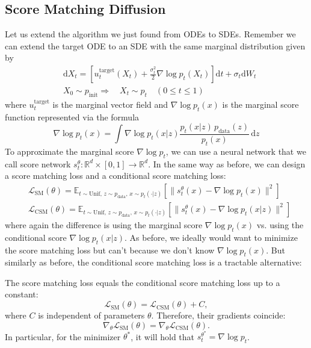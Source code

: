 \subsection{Score Matching Diffusion}
Let us extend the algorithm we just found from ODEs to SDEs. Remember we can extend the target ODE to an SDE with the same marginal distribution given by
\begin{equation}
    \begin{aligned}
    &\mathrm{d}X_t = \left[ u_t^{\text{target}}(X_t) + \frac{\sigma_t^2}{2} \nabla \log p_t(X_t) \right] \mathrm{d}t + \sigma_t \mathrm{d}W_t\\
    &X_0 \sim p_{\text{init}} \Rightarrow \quad X_t \sim p_t \quad (0 \leq t \leq 1)
    \end{aligned}
\end{equation}
where $u_t^{\text{target}}$ is the marginal vector field and $\nabla \log p_t(x)$ is the marginal score function represented via the formula
\begin{equation}
\nabla \log p_t(x) = \int \nabla \log p_t(x | z) \frac{p_t(x | z)\, p_{\text{data}}(z)}{p_t(x)} \, \mathrm{d}z
\end{equation}
To approximate the marginal score $\nabla \log p_t$, we can use a neural network that we call score network $s_t^\theta : \mathbb{R}^d \times [0, 1] \rightarrow \mathbb{R}^d$. In the same way as before, we can design a score matching loss and a conditional score matching loss:
\begin{equation}
    \begin{aligned}
    &\mathcal{L}_{\text{SM}}(\theta) = \mathbb{E}_{t \sim \text{Unif},\, z \sim p_{\text{data}},\, x \sim p_t(\cdot | z)} \left[ \| s_t^\theta(x) - \nabla \log p_t(x) \|^2 \right]\\
    &\mathcal{L}_{\text{CSM}}(\theta) = \mathbb{E}_{t \sim \text{Unif},\, z \sim p_{\text{data}},\, x \sim p_t(\cdot | z)} \left[ \| s_t^\theta(x) - \nabla \log p_t(x | z) \|^2 \right]
    \end{aligned}
\end{equation}
where again the difference is using the marginal score $\nabla \log p_t(x)$ vs. using the conditional score $\nabla \log p_t(x | z)$. As before, we ideally would want to minimize the score matching loss but can’t because we don’t know $\nabla \log p_t(x)$. But similarly as before, the conditional score matching loss is a tractable alternative:

\begin{theorem}
The score matching loss equals the conditional score matching loss up to a constant:
\begin{equation}
\mathcal{L}_{\text{SM}}(\theta) = \mathcal{L}_{\text{CSM}}(\theta) + C,
\end{equation}
where $C$ is independent of parameters $\theta$. Therefore, their gradients coincide:
\begin{equation}
\nabla_\theta \mathcal{L}_{\text{SM}}(\theta) = \nabla_\theta \mathcal{L}_{\text{CSM}}(\theta).
\end{equation}
In particular, for the minimizer $\theta^*$, it will hold that $s_t^{\theta^*} = \nabla \log p_t$.
\end{theorem}


